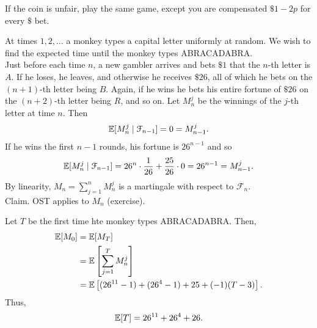 \documentclass[11pt]{article}
\begin{document}
\begin{example} If the coin is unfair, play the same game, except you are compensated $\$ 1 - 2p$ for every $\$$ bet.
\end{example}

\begin{example} At times $1, 2, \dots$ a monkey types a capital letter uniformly at random. We wish to find the expected time until the monkey types ABRACADABRA. \\

  Just before each time $n$, a new gambler arrives and bets $\$ 1$ that the $n$-th letter is $A$. If he loses, he leaves, and otherwise he receives $\$ 26$, all of which he bets on the $(n+1)$-th letter being $B$. Again, if he wins he bets his entire fortune of $\$ 26$ on the $(n +2)$-th letter being $R$, and so on. Let $M_n^j$ be the winnings of the $j$-th letter at time $n$. Then \begin{align*} \mathbb{E} [M_n^j \mid \mathcal{F}_{n - 1}] = 0 = M_{n - 1}^j.
  \end{align*} If he wins the first $n - 1$ rounds, his fortune is $26^{n - 1}$ and so \begin{align*} \mathbb{E} [ M_n^j \mid \mathcal{F}_{n - 1}] = 26^n \cdot \frac{1}{26} + \frac{25}{26} \cdot 0 = 26^{n - 1} = M_{n - 1}^j.
  \end{align*} By linearity, $M_n = \sum_{j = 1}^n M_n^j$ is a martingale with respect to $\mathcal{F}_n$. \\

  Claim. OST applies to $M_n$ (exercise).

  Let $T$ be the first time hte monkey types ABRACADABRA. Then, \begin{align*} \mathbb{E} [ M_0 ] & = \mathbb{E} [M_T]  \\ & = \mathbb{E} \left[ \sum_{j = 1}^T M_n^j \right] \\ & = \mathbb{E} \left[ (26^{11} - 1) + (26^4 - 1) + 25 + (-1)(T - 3) \right].
  \end{align*} Thus, \begin{align*} \mathbb{E} [T] = 26^{11} + 26^4 + 26.
  \end{align*}
\end{example}
  
\end{document}
